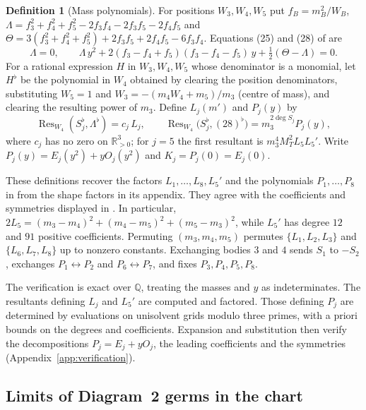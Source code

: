 \documentclass[Threeside,11pt]{article}
\theoremstyle{definition}
\newtheorem{definition}[theorem]{Definition}
\theoremstyle{remark}
\numberwithin{equation}{section}
\theoremstyle{remark}
\newcommand{\Rp}{\mathbb{R}_{>0}}
\begin{document}
\begin{definition}[Mass polynomials]\label{def:d2-mass}
For positions $W_3,W_4,W_5$ put $f_B=m_B^2/W_B$,
$\Lambda=f_3^2+f_4^2+f_5^2-2f_3f_4-2f_3f_5-2f_4f_5$ and
$\Theta=3(f_3^2+f_4^2+f_5^2)+2f_3f_5+2f_4f_5-6f_3f_4$.  Equations (25) and (28) of
\cite[\S8.2]{AK} are
\begin{equation*}
  \Lambda=0,\qquad
  \Lambda\,y^2+2(f_3-f_4+f_5)(f_3-f_4-f_5)\,y+\tfrac12(\Theta-\Lambda)=0 .
\end{equation*}
For a rational expression $H$ in $W_3,W_4,W_5$ whose denominator is a monomial, let $H^\flat$ be
the polynomial in $W_4$ obtained by clearing the position denominators, substituting $W_5=1$ and
$W_3=-(m_4W_4+m_5)/m_3$ (centre of mass), and clearing the resulting power of $m_3$.  Define
$L_j(m')$ and $P_j(y)$ by
\[
  \operatorname{Res}_{W_4}(S_j^\flat,\Lambda^\flat)=c_j\,L_j,\qquad
  \operatorname{Res}_{W_4}\bigl(S_j^\flat,(28)^\flat\bigr)=m_3^{2\deg S_j}P_j(y),
\]
where $c_j$ has no zero on $\Rp^3$; for $j=5$ the first resultant is
$m_3^4M_T^2L_5L_5'$.  Write $P_j(y)=E_j(y^2)+yO_j(y^2)$ and $K_j=P_j(0)=E_j(0)$.
\end{definition}

{These definitions recover the factors $L_1,\dots,L_8,L_5'$ and the
polynomials $P_1,\dots,P_8$ in \cite[pp.~573--575]{AK} from the shape factors in its appendix.
They agree with the coefficients and symmetries displayed in \cite{AK}.
In particular, $2L_5=(m_3-m_4)^2+(m_4-m_5)^2+(m_5-m_3)^2$, while $L_5'$ has degree $12$
and $91$ positive coefficients.
Permuting $(m_3,m_4,m_5)$ permutes $\{L_1,L_2,L_3\}$ and $\{L_6,L_7,L_8\}$ up to nonzero
constants.  Exchanging bodies $3$ and $4$ sends $S_1$ to $-S_2$, exchanges
$P_1\leftrightarrow P_2$ and $P_6\leftrightarrow P_7$, and fixes $P_3,P_4,P_5,P_8$.}

{The verification is exact over $\mathbb Q$, treating the masses and
$y$ as indeterminates.  The resultants defining $L_j$ and $L_5'$ are computed and factored.
Those defining $P_j$ are determined by evaluations on unisolvent grids modulo three primes,
with a priori bounds on the degrees and coefficients.  Expansion and substitution then
verify the decompositions $P_j=E_j+yO_j$, the leading coefficients and the symmetries
(Appendix~\ref{app:verification}).}
\subsection{\texorpdfstring{Limits of Diagram~2 germs in the chart}{Limits of Diagram 2 germs in the chart}}\label{sec:d2-cover}
\end{document}
